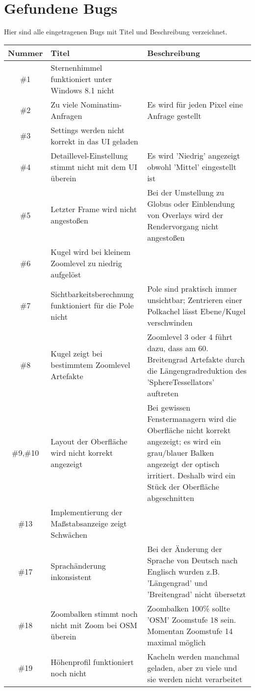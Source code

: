 \documentclass[10pt]{scrreprt}
\begin{document}
\section{Gefundene Bugs}
Hier sind alle eingetragenen Bugs mit Titel und Beschreibung verzeichnet.
\begin{longtable}{|c|p{5.2cm}|p{8.2cm}|}
\hline
Nummer & Titel & Beschreibung \\
\hline
\hline
\#1 & Sternenhimmel funktioniert unter Windows 8.1 nicht & \\
\hline
\#2 & Zu viele Nominatim-Anfragen & Es wird für jeden Pixel eine Anfrage gestellt \\
\hline
\#3 & Settings werden nicht korrekt in das UI geladen & \\
\hline
\#4 & Detaillevel-Einstellung stimmt nicht mit dem UI überein & Es wird 'Niedrig' angezeigt
 obwohl 'Mittel' eingestellt ist \\
\hline
\#5 & Letzter Frame wird nicht angestoßen & Bei der Umstellung zu Globus oder Einblendung von Overlays wird der Rendervorgang nicht angestoßen\\
\hline
\#6 & Kugel wird bei kleinem Zoomlevel zu niedrig aufgelöst & \\
\hline
\#7 & Sichtbarkeitsberechnung funktioniert für die Pole nicht & Pole sind praktisch immer unsichtbar; Zentrieren einer Polkachel lässt Ebene/Kugel verschwinden \\
\hline
\#8 & Kugel zeigt bei bestimmtem Zoomlevel Artefakte & Zoomlevel 3 oder 4 führt dazu, dass am 60. Breitengrad Artefakte durch die Längengradreduktion des 'SphereTessellators' auftreten \\
\hline
\#9,\#10 & Layout der Oberfläche wird nicht korrekt angezeigt & Bei gewissen Fenstermanagern wird die Oberfläche nicht korrekt angezeigt; es wird ein grau/blauer Balken angezeigt der optisch irritiert. Deshalb wird ein Stück der Oberfläche abgeschnitten \\
\hline
\#13 & Implementierung der Maßstabsanzeige zeigt Schwächen & \\
\hline
\#17 & Sprachänderung inkonsistent & Bei der Änderung der Sprache von Deutsch nach Englisch wurden z.B. 'Längengrad' und 'Breitengrad' nicht übersetzt\\
\hline
\#18 & Zoombalken stimmt noch nicht mit Zoom bei OSM überein & Zoombalken 100\% sollte 'OSM' Zoomstufe 18 sein. Momentan Zoomstufe 14 maximal möglich\\
\hline
\#19 & Höhenprofil funktioniert noch nicht & Kacheln werden manchmal geladen, aber zu viele und sie werden nicht verarbeitet \\

\end{longtable}
\end{document}
